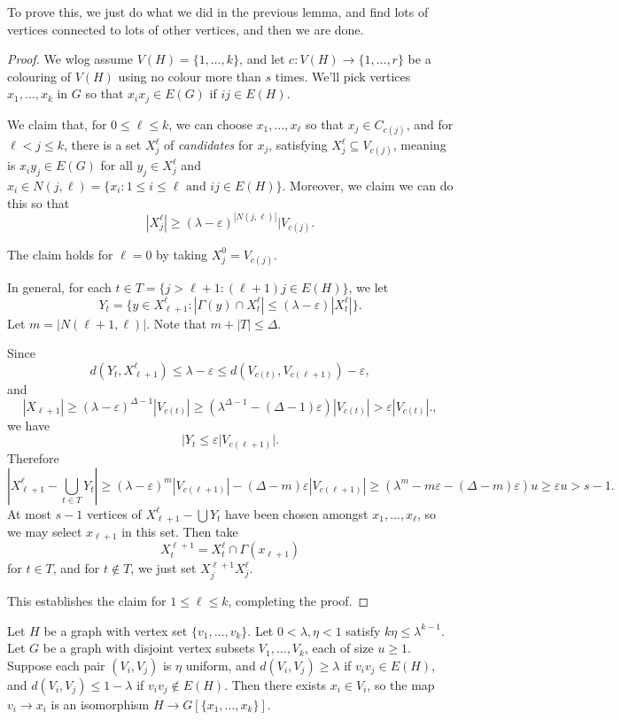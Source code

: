 \documentclass[a4paper]{article}
\begin{document}
To prove this, we just do what we did in the previous lemma, and find lots of vertices connected to lots of other vertices, and then we are done.
\begin{proof}
  We wlog assume $V(H) = \{1, \ldots, k\}$, and let $c: V(H) \to \{1, \ldots, r\}$ be a colouring of $V(H)$ using no colour more than $s$ times. We'll pick vertices $x_1, \ldots, x_k$ in $G$ so that $x_i x_j \in E(G)$ if $ij \in E(H)$.

  We claim that, for $0 \leq \ell \leq k$, we can choose $x_1, \ldots, x_\ell$ so that $x_j \in C_{c(j)}$, and for $\ell < j \leq k$, there is a set $X^{\ell}_j$ of \emph{candidates} for $x_j$, satisfying $X_j^{\ell} \subseteq V_{c(j)}$, meaning is $x_i y_j \in E(G)$ for all $y_j \in X_j^{\ell}$ and $x_i \in N(j, \ell) = \{x_i: 1 \leq i \leq \ell \text{ and }ij \in E(H)\}$. Moreover, we claim we can do this so that
  \[
    |X_j^{\ell}| \geq (\lambda - \varepsilon)^{|N(j, \ell)|} |V_{c(j)}.
  \]

  The claim holds for $\ell = 0$ by taking $X_j^0 = V_{c(j)}$.

  In general, for each $t \in T = \{j > \ell + 1 : (\ell + 1)j \in E(H)\}$, we let
  \[
    Y_t =  \{y \in X_{\ell + 1}^{\ell} : |\Gamma(y) \cap X_t^\ell| \leq (\lambda - \varepsilon) |X^{\ell}_t|\}.
  \]
  Let $m = |N(\ell + 1, \ell)|$. Note that $m + |T| \leq \Delta$.

  Since
  \[
    d(Y_t, X_{\ell + 1}^\ell) \leq \lambda - \varepsilon \leq d(V_{c(t)}, V_{c(\ell + 1)}) - \varepsilon,
  \]
  and
  \[
    |X_{\ell + 1}| \geq (\lambda - \varepsilon)^{\Delta - 1} |V_{c(t)}| \geq (\lambda^{\Delta - 1} - (\Delta - 1)\varepsilon) |V_{c(t)}| > \varepsilon |V_{c(t)}|.,
  \]
  we have
  \[
    |Y_t \leq \varepsilon |V_{c(\ell + 1)}|.
  \]
  Therefore
  \[
    \left|X_{\ell + 1}^{\ell} - \bigcup_{t \in T} Y_t \right| \geq (\lambda - \varepsilon)^m |V_{c(\ell + 1)}| - (\Delta - m) \varepsilon|V_{c(\ell + 1)}| \geq (\lambda^m - m\varepsilon - (\Delta - m)\varepsilon) u \geq \varepsilon u > s - 1.
  \]
  At most $s - 1$ vertices of $X_{\ell + 1}^\ell - \bigcup Y_t$ have been chosen amongst $x_1, \ldots, x_\ell$, so we may select $x_{\ell + 1}$ in this set. Then take
  \[
    X^{\ell + 1}_t = X^\ell_t \cap \Gamma(x_{\ell + 1})
  \]
  for $t \in T$, and for $t \not \in T$, we just set $X_j^{\ell + 1} X_j^{\ell}$.

  This establishes the claim for $1 \leq \ell \leq k$, completing the proof.
\end{proof}

\begin{cor}
  Let $H$ be a graph with vertex set $\{v_1, \ldots, v_k\}$. Let $0 < \lambda, \eta < 1$ satisfy $k \eta \leq \lambda^{k - 1}$. Let $G$ be a graph with disjoint vertex subsets $V_1, \ldots, V_k$, each of size $u \geq 1$. Suppose each pair $(V_i, V_j)$ is $\eta$ uniform, and $d(V_i, V_j) \geq \lambda$ if $v_i v_j \in E(H)$, and $d(V_i, V_j) \leq 1 - \lambda$ if $v_i v_j \not \in E(H)$. Then there exists $x_i \in V_i$, so the map $v_i \to x_i$ is an isomorphism $H \to G[\{x_1, \ldots, x_k\}]$.
\end{cor}
\end{document}
